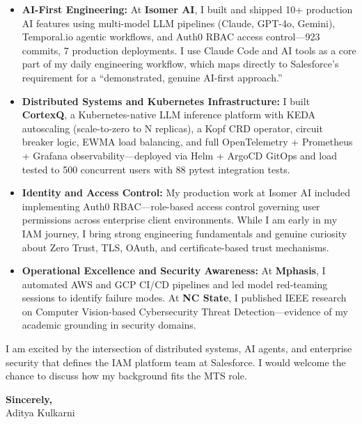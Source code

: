\documentclass[11pt,letterpaper]{article}
\begin{document}
\begin{itemize}[leftmargin=*, itemsep=3pt, label={\color{SalesforceBlue}\faAngleRight}]
    \item \textbf{AI-First Engineering:} At \textbf{Isomer AI}, I built and shipped 10+ production AI features using multi-model LLM pipelines (Claude, GPT-4o, Gemini), Temporal.io agentic workflows, and Auth0 RBAC access control---923 commits, 7 production deployments. I use Claude Code and AI tools as a core part of my daily engineering workflow, which maps directly to Salesforce's requirement for a ``demonstrated, genuine AI-first approach.''

    \item \textbf{Distributed Systems and Kubernetes Infrastructure:} I built \textbf{CortexQ}, a Kubernetes-native LLM inference platform with KEDA autoscaling (scale-to-zero to N replicas), a Kopf CRD operator, circuit breaker logic, EWMA load balancing, and full OpenTelemetry + Prometheus + Grafana observability---deployed via Helm + ArgoCD GitOps and load tested to 500 concurrent users with 88 pytest integration tests.

    \item \textbf{Identity and Access Control:} My production work at Isomer AI included implementing Auth0 RBAC---role-based access control governing user permissions across enterprise client environments. While I am early in my IAM journey, I bring strong engineering fundamentals and genuine curiosity about Zero Trust, TLS, OAuth, and certificate-based trust mechanisms.

    \item \textbf{Operational Excellence and Security Awareness:} At \textbf{Mphasis}, I automated AWS and GCP CI/CD pipelines and led model red-teaming sessions to identify failure modes. At \textbf{NC State}, I published IEEE research on Computer Vision-based Cybersecurity Threat Detection---evidence of my academic grounding in security domains.
\end{itemize}

\vspace{6pt}

I am excited by the intersection of distributed systems, AI agents, and enterprise security that defines the IAM platform team at Salesforce. I would welcome the chance to discuss how my background fits the MTS role.

\vspace{12pt}

\textbf{Sincerely,}\\[8pt]
Aditya Kulkarni
\end{document}
